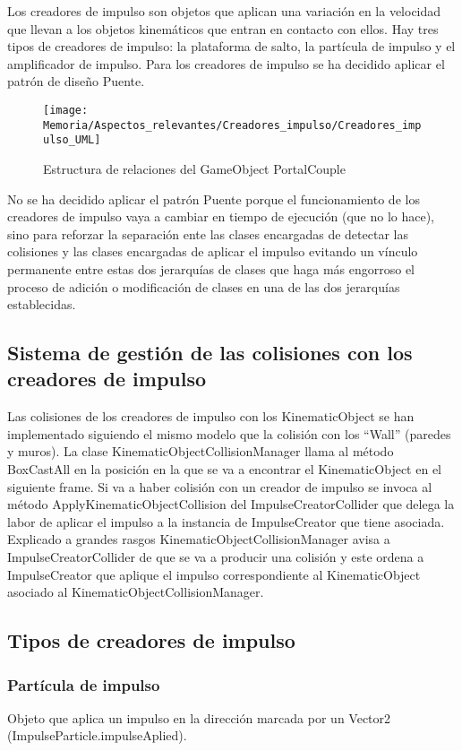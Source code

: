 Los creadores de impulso son objetos que aplican una variación en la velocidad que llevan a los objetos kinemáticos que entran en contacto con ellos. Hay tres tipos de creadores de impulso: la plataforma de salto, la partícula de impulso y el amplificador de impulso.
Para los creadores de impulso se ha decidido aplicar el patrón de diseño Puente.
\clearpage

\begin{figure}[h]
\texttt{[image: Memoria/Aspectos\_relevantes/Creadores\_impulso/Creadores\_impulso\_UML]}
\caption{Estructura de relaciones del GameObject PortalCouple}
\end{figure}

No se ha decidido aplicar el patrón Puente porque el funcionamiento de los creadores de impulso vaya a cambiar en tiempo de ejecución (que no lo hace), sino para reforzar la separación ente las clases encargadas de detectar las colisiones y las clases encargadas de aplicar el impulso evitando un vínculo permanente entre estas dos jerarquías de clases que haga más engorroso el proceso de adición o modificación de clases en una de las dos jerarquías establecidas.

\subsection{Sistema de gestión de las colisiones con los creadores de impulso}
Las colisiones de los creadores de impulso con los KinematicObject se han implementado siguiendo el mismo modelo que la colisión con los “Wall” (paredes y muros). La clase KinematicObjectCollisionManager llama al método BoxCastAll en la posición en la que se va a encontrar el KinematicObject en el siguiente frame. Si va a haber colisión con un creador de impulso se invoca al método ApplyKinematicObjectCollision del ImpulseCreatorCollider que delega la labor de aplicar el impulso a la instancia de ImpulseCreator que tiene asociada.\\
Explicado a grandes rasgos KinematicObjectCollisionManager avisa a ImpulseCreatorCollider de que se va a producir una colisión y este ordena a ImpulseCreator que aplique el impulso correspondiente al KinematicObject asociado al KinematicObjectCollisionManager.

\subsection{Tipos de creadores de impulso}
\subsubsection{Partícula de impulso}
Objeto que aplica un impulso en la dirección marcada por un Vector2 (ImpulseParticle.impulseAplied).

